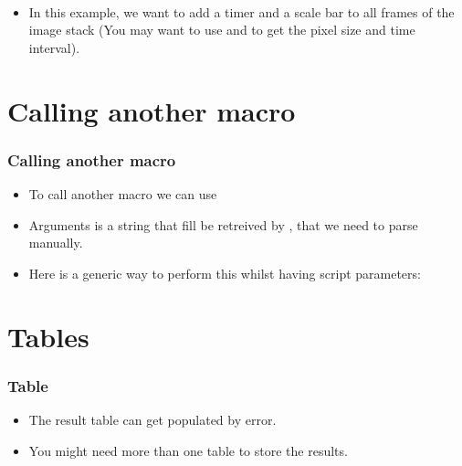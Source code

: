 \begin{frame}[fragile]
  \begin{example}~\par
    \begin{itemize}
    \item In this example, we want to add a timer and a scale bar to
      all frames of the image stack (You may want to use  and  to get the pixel size and time interval).
       \only<presentation>{}
    \end{itemize}
  \end{example}
\end{frame}


\section{Calling another macro}

\begin{frame}
  \frametitle<presentation>{Calling another macro}
  \begin{itemize}
  \item To call another macro we can use 
  \item Arguments is a string that fill be retreived by , that
    we need to parse manually.
  \item Here is a generic way to perform this whilst having script parameters:
  \only<article>{}
\end{itemize}
\end{frame}

\section{Tables}
\begin{frame}[fragile]
  \frametitle<presentation>{Table}
  \begin{itemize}
  \item The result table can get populated by error.
  \item You might need more than one table to store the results.
  \end{itemize}
\end{frame}


